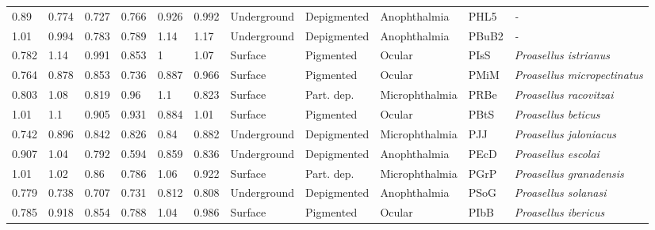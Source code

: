 \begin{tabular}{lllllllllll}
           0.89 &           0.774 &           0.727 &           0.766 &           0.926 &           0.992 &  Underground &  Depigmented &     Anophthalmia &     PHL5 &                               \textit{-} \\
           1.01 &           0.994 &           0.783 &           0.789 &            1.14 &            1.17 &  Underground &  Depigmented &     Anophthalmia &    PBuB2 &                               \textit{-} \\
          0.782 &            1.14 &           0.991 &           0.853 &               1 &            1.07 &      Surface &    Pigmented &           Ocular &     PIsS &            \textit{Proasellus istrianus} \\
          0.764 &           0.878 &           0.853 &           0.736 &           0.887 &           0.966 &      Surface &    Pigmented &           Ocular &     PMiM &      \textit{Proasellus micropectinatus} \\
          0.803 &            1.08 &           0.819 &            0.96 &             1.1 &           0.823 &      Surface &   Part. dep. &   Microphthalmia &     PRBe &           \textit{Proasellus racovitzai} \\
           1.01 &             1.1 &           0.905 &           0.931 &           0.884 &            1.01 &      Surface &    Pigmented &           Ocular &     PBtS &              \textit{Proasellus beticus} \\
          0.742 &           0.896 &           0.842 &           0.826 &            0.84 &           0.882 &  Underground &  Depigmented &   Microphthalmia &      PJJ &           \textit{Proasellus jaloniacus} \\
          0.907 &            1.04 &           0.792 &           0.594 &           0.859 &           0.836 &  Underground &  Depigmented &     Anophthalmia &     PEcD &              \textit{Proasellus escolai} \\
           1.01 &            1.02 &            0.86 &           0.786 &            1.06 &           0.922 &      Surface &   Part. dep. &   Microphthalmia &     PGrP &          \textit{Proasellus granadensis} \\
          0.779 &           0.738 &           0.707 &           0.731 &           0.812 &           0.808 &  Underground &  Depigmented &     Anophthalmia &     PSoG &             \textit{Proasellus solanasi} \\
          0.785 &           0.918 &           0.854 &           0.788 &            1.04 &           0.986 &      Surface &    Pigmented &           Ocular &     PIbB &             \textit{Proasellus ibericus} \\

\end{tabular}
